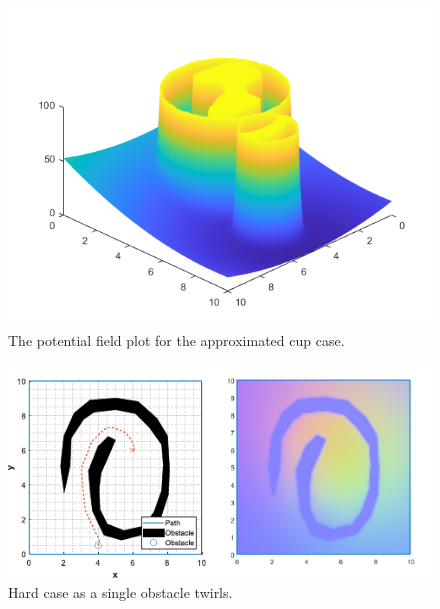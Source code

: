 \documentclass{IEEEtaes}
\begin{document}
{\begin{figure}
    \vspace{-1em}
    \begin{center}    
        \includegraphics[width=0.8\linewidth]{cup-pot-approx.png}
    \end{center}
     \caption{The potential field plot for the approximated cup case.}
     \label{three}
\end{figure}


\begin{figure}[b]
    \vspace{-1em}
    \begin{center}    
        \includegraphics[width=0.8\linewidth]{swirl-1.pdf}
    \end{center}
     \caption{Hard case as a single obstacle twirls.}
     \label{three}
\end{figure}


}
\end{document}
